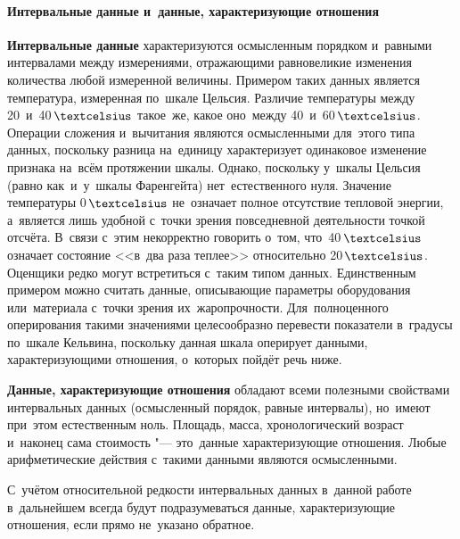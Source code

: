 \documentclass[]{scrartcl}
\begin{document}
\paragraph{Интервальные данные и~данные, характеризующие отношения}\label{Interval-data}
\par
\textbf{Интервальные данные} характеризуются осмысленным порядком и~равными интервалами между измерениями, отражающими равновеликие изменения количества любой измеренной величины. Примером таких данных является температура, измеренная по~шкале Цельсия. Различие температуры между 20~и~40\,$\textcelsius$ такое~же, какое оно~между 40~и~60\,$\textcelsius$. Операции сложения и~вычитания являются осмысленными для~этого типа данных, поскольку разница на~единицу характеризует одинаковое изменение признака на~всём протяжении шкалы. Однако, поскольку у~шкалы Цельсия (равно как~и~у~шкалы Фаренгейта) нет~естественного нуля. Значение температуры 0\,$\textcelsius$ не~означает полное отсутствие тепловой энергии, а~является лишь удобной с~точки зрения повседневной деятельности точкой отсчёта. В~связи с~этим некорректно говорить о~том, что~40\,$\textcelsius$ означает состояние <<в~два раза теплее>> относительно 20\,$\textcelsius$. Оценщики редко могут встретиться с~таким типом данных. Единственным примером можно считать данные, описывающие параметры оборудования или~материала с~точки зрения их~жаропрочности. Для~полноценного оперирования такими значениями целесообразно перевести показатели в~градусы по~шкале Кельвина, поскольку данная шкала оперирует данными, характеризующими отношения, о~которых пойдёт речь ниже.
\par
\textbf{Данные, характеризующие отношения} обладают всеми полезными свойствами интервальных данных (осмысленный порядок, равные интервалы), но~имеют при~этом естественным ноль. Площадь, масса, хронологический возраст и~наконец сама стоимость "--- это~данные характеризующие отношения. Любые арифметические действия с~такими данными являются осмысленными.
\par
С~учётом относительной редкости интервальных данных в~данной работе в~дальнейшем всегда будут подразумеваться данные, характеризующие отношения, если прямо не~указано обратное.
\end{document}
